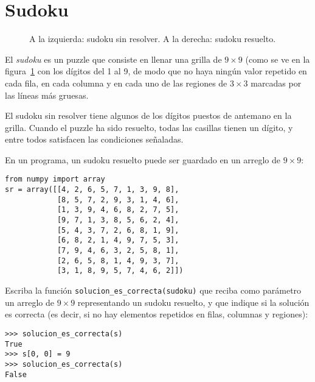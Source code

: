 \section{Sudoku}

\begin{figure}
  \centering
  
  \caption{%
    A la izquierda: sudoku sin resolver.
    A la derecha: sudoku resuelto.
  }
  \label{fig:sudoku}
\end{figure}

El \emph{sudoku} es un puzzle que consiste en llenar
una grilla de \(9 × 9\)
(como se ve en la figura~\ref{fig:sudoku}
con los dígitos del 1 al 9,
de modo que no haya ningún valor repetido en
cada fila, en cada columna y en cada uno de las regiones de \(3 × 3\)
marcadas por las líneas más gruesas.

El sudoku sin resolver tiene algunos de los dígitos puestos de antemano
en la grilla. Cuando el puzzle ha sido resuelto, todas las casillas
tienen un dígito, y entre todos satisfacen las condiciones señaladas.

En un programa, un sudoku resuelto puede ser guardado en un arreglo de
\(9 × 9\):

\begin{lstlisting}
from numpy import array
sr = array([[4, 2, 6, 5, 7, 1, 3, 9, 8],
            [8, 5, 7, 2, 9, 3, 1, 4, 6],
            [1, 3, 9, 4, 6, 8, 2, 7, 5],
            [9, 7, 1, 3, 8, 5, 6, 2, 4],
            [5, 4, 3, 7, 2, 6, 8, 1, 9],
            [6, 8, 2, 1, 4, 9, 7, 5, 3],
            [7, 9, 4, 6, 3, 2, 5, 8, 1],
            [2, 6, 5, 8, 1, 4, 9, 3, 7],
            [3, 1, 8, 9, 5, 7, 4, 6, 2]])
\end{lstlisting}

Escriba la función \lstinline!solucion_es_correcta(sudoku)! que reciba
como parámetro un arreglo de \(9 × 9\) representando un sudoku resuelto, y
que indique si la solución es correcta (es decir, si no hay elementos
repetidos en filas, columnas y regiones):

\begin{lstlisting}
>>> solucion_es_correcta(s)
True
>>> s[0, 0] = 9
>>> solucion_es_correcta(s)
False
\end{lstlisting}

